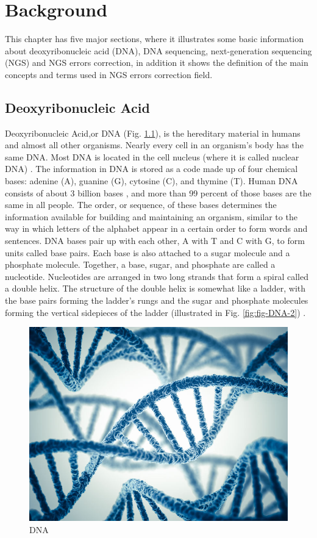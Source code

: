 \documentclass[12pt,openany]{llncs}
\begin{document}
\newpage
\chapter{\label{chap:2}Background}
This chapter has five major sections, where it illustrates some basic information about deoxyribonucleic acid (DNA), DNA sequencing, next-generation sequencing (NGS) and NGS errors correction, in addition it shows the definition of the main concepts and terms used in NGS errors correction field.
\section{Deoxyribonucleic Acid}
Deoxyribonucleic Acid,or DNA  (Fig. \ref{fig:fig-DNA-1}), is the hereditary material in humans and almost all other organisms. Nearly every cell in an organism’s body has the same DNA. Most DNA is located in the cell nucleus (where it is called nuclear DNA) \cite{DNA1,DNA2}.
The information in DNA is stored as a code made up of four chemical bases: adenine (A), guanine (G), cytosine (C), and thymine (T). Human DNA consists of about 3 billion bases \cite{DNA4}, and more than 99 percent of those bases are the same in all people. The order, or sequence, of these bases determines the information available for building and maintaining an organism, similar to the way in which letters of the alphabet appear in a certain order to form words and sentences.
DNA bases pair up with each other, A with T and C with G, to form units called base pairs. Each base is also attached to a sugar molecule and a phosphate molecule. Together, a base, sugar, and phosphate are called a nucleotide. Nucleotides are arranged in two long strands that form a spiral called a double helix. The structure of the double helix is somewhat like a ladder, with the base pairs forming the ladder’s rungs and the sugar and phosphate molecules forming the vertical sidepieces of the ladder (illustrated in Fig. \ref{fig:fig-DNA-2}) \cite{DNA5}.
\newpage
\begin{figure}
	\centering
	\includegraphics{./figs/DNA-1}
    \caption{\label{fig:fig-DNA-1}DNA}
\end{figure}
\end{document}
